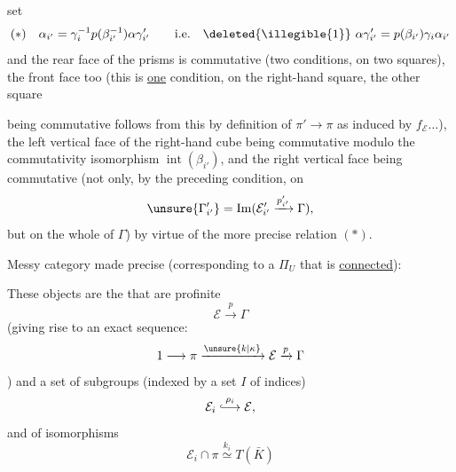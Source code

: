 
 set
\[
(*)\quad\alpha_{i'}=\gamma_i^{-1}p(\beta_{i'}^{-1})\alpha\gamma'_{i'}
\qquad\text{i.e.}\quad\deleted{\illegible{1}}\ \alpha\gamma'_{i'}=p(\beta_{i'})\gamma_i\alpha_{i'}
\]
and  the rear  face of the prisms is commutative (two conditions, on two squares), the front  face too (this is \uline{one} condition, on the right-hand square, the other square


being commutative follows from this by definition of $\pi'\longrightarrow\pi$ as induced by $f_{\mathcal E}\ldots$), the left vertical face of the right-hand cube being commutative modulo the commutativity isomorphism $\operatorname{int}(\beta_{i'})$, and the right vertical face being commutative (not only, by the preceding condition, on
\[
\unsure{\Gamma'_{i'}}=\operatorname{Im}(\mathcal E'_{i'}\xrightarrow{p'_{i'}}\Gamma),
\]
but on the whole of $\Gamma$) by virtue of the more precise relation $(*)$.


Messy category made precise (corresponding to a $\Pi_U$ that is \uline{connected}):

These objects are the  that are profinite 
\[
\mathcal E\xrightarrow{p}\Gamma
\]
(giving rise to an exact sequence:
\[
1\longrightarrow\pi\xrightarrow{\unsure{k|\kappa}}\mathcal E\xrightarrow{p}\Gamma
\]
)
and a  set of subgroups (indexed by a set $I$ of indices)
\[
\mathcal E_i\overset{\rho_i}{\lhook\joinrel\longrightarrow}\mathcal E,
\]
and of isomorphisms
\[
\mathcal E_i\cap\pi\overset{k_i}{\simeq}T(\bar K)
\]

